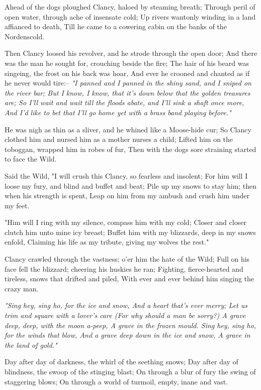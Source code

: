 \begin{poemblock}
 Ahead of the dogs ploughed Clancy, haloed by steaming breath;
  Through peril of open water, through ache of insensate cold;
 Up rivers wantonly winding in a land affianced to death,
  Till he came to a cowering cabin on the banks of the Nordenscold.

 Then Clancy loosed his revolver, and he strode through the open door;
  And there was the man he sought for, crouching beside the fire;
 The hair of his beard was singeing, the frost on his back was hoar,
  And ever he crooned and chanted as if he never would tire:--
\textit{
  "I panned and I panned in the shiny sand,
and I sniped on the river bar;
  But I know, I know, that it's down below
that the golden treasures are;
  So I'll wait and wait till the floods abate,
and I'll sink a shaft once more,
  And I'd like to bet that I'll go home yet
with a brass band playing before."
}

 He was nigh as thin as a sliver, and he whined like a Moose-hide cur;
  So Clancy clothed him and nursed him as a mother nurses a child;
 Lifted him on the toboggan, wrapped him in robes of fur,
  Then with the dogs sore straining started to face the Wild.

 Said the Wild, "I will crush this Clancy, so fearless and insolent;
  For him will I loose my fury, and blind and buffet and beat;
 Pile up my snows to stay him; then when his strength is spent,
  Leap on him from my ambush and crush him under my feet.

 "Him will I ring with my silence, compass him with my cold;
  Closer and closer clutch him unto mine icy breast;
 Buffet him with my blizzards, deep in my snows enfold,
  Claiming his life as my tribute, giving my wolves the rest."

 Clancy crawled through the vastness; o'er him the hate of the Wild;
  Full on his face fell the blizzard; cheering his huskies he ran;
 Fighting, fierce-hearted and tireless, snows that drifted and piled,
  With ever and ever behind him singing the crazy man.

\textit{
  "Sing hey, sing ho, for the ice and snow,
   And a heart that's ever merry;
  Let us trim and square with a lover's care
   (For why should a man be sorry?)
  A grave deep, deep, with the moon a-peep,
   A grave in the frozen mould.
  Sing hey, sing ho, for the winds that blow,
  And a grave deep down in the ice and snow,
   A grave in the land of gold."
}

 Day after day of darkness, the whirl of the seething snows;
  Day after day of blindness, the swoop of the stinging blast;
 On through a blur of fury the swing of staggering blows;
  On through a world of turmoil, empty, inane and vast.


\end{poemblock}
